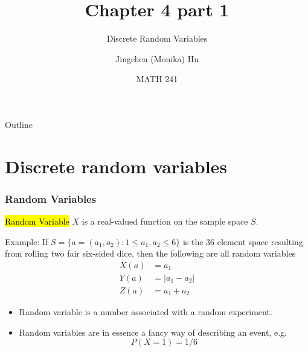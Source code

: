 \documentclass[slidestop,compress,mathserif]{beamer}
\title[Chapter 4 part 1]{Chapter 4 part 1}
\subtitle{Discrete Random Variables}
\author[Jingchen (Monika) Hu] %
{Jingchen (Monika) Hu}
\institute[Vassar] %
{Vassar College}
\date[MATH 241] %
{MATH 241}
\begin{document}


\begin{frame}%
\titlepage
\end{frame}

%
%
%
%
%
%


\begin{frame}{Outline}
\tableofcontents[hideallsubsections]
\end{frame}



\section{Discrete random variables}
\begin{frame}
\frametitle{Random Variables}

\begin{defn}
\hl{Random Variable} $X$ is a real-valued  function on the sample space $S$.
\end{defn}

\pause
Example: If $S = \{a = (a_1,a_2): 1\leq a_1, a_2 \leq 6\}$ is the 36 element space resulting from rolling two fair six-sided dice, then the following are all random variables
\begin{align*}
X(a) &= a_1 \\
Y(a) &= |a_1-a_2| \\
Z(a) &= a_1+a_2
\end{align*}


\pause
\begin{itemize}
\item Random variable is a number associated with a random experiment.
\item Random variables are in essence a fancy way of describing an event, e.g.
\[P(X=1) = 1/6\]

\end{itemize}
\end{frame}
\end{document}
